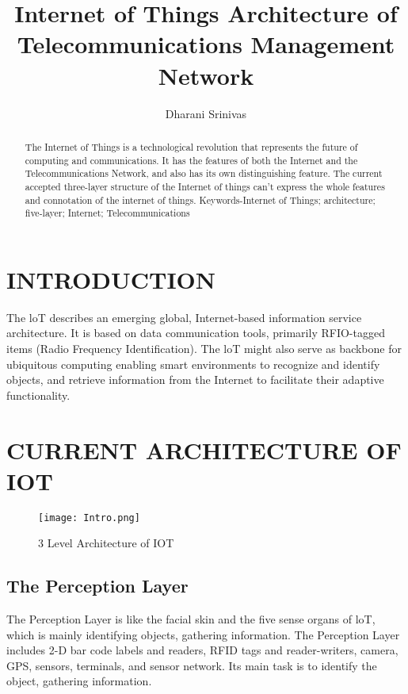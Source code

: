 \documentclass{article}
\title{Internet of Things Architecture of Telecommunications Management Network}
\author{Dharani Srinivas}
\begin{document}
\maketitle

\begin{abstract}
The Internet of Things is a technological revolution that represents the future of computing and communications. It has the features of both the Internet and the Telecommunications Network, and also has its own distinguishing feature. The current accepted three-layer structure of the Internet of things can't express the whole features and connotation of the internet of things.
Keywords-Internet of Things; architecture; five-layer; Internet; Telecommunications
\end{abstract}

\section{INTRODUCTION}

The loT describes an emerging global, Internet-based information service architecture. It is based on data communication tools, primarily RFIO-tagged items (Radio Frequency Identification). The loT might also serve as backbone for ubiquitous computing enabling smart environments to recognize and identify objects, and retrieve information from the Internet to facilitate their adaptive functionality.


\section{CURRENT ARCHITECTURE OF IOT}
\begin{figure}[h]
\centering
\texttt{[image: Intro.png]}
\caption{\label{fig:frog}3 Level Architecture of IOT}
\end{figure}



\subsection{The Perception Layer}

The Perception Layer is like the facial skin and the five sense organs of loT, which is mainly identifying objects, gathering information. The Perception Layer includes 2-D bar code labels and readers, RFID tags and reader-writers, camera, GPS, sensors, terminals, and sensor network. Its main task is to identify the object, gathering information.
\end{document}
